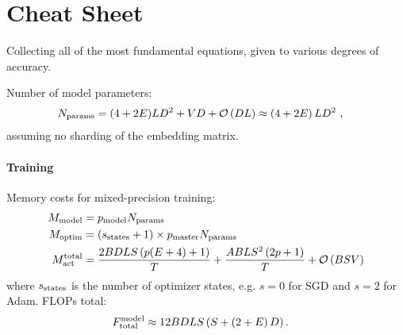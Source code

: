 \section{Cheat Sheet \label{app_cheat_sheet}}

Collecting all of the most fundamental equations, given to various degrees of accuracy.

Number of model parameters:
\begin{align}
	N _{ {\rm params} } & =   (4+2E)LD ^{ 2 } + VD+ \mathcal{O} \left( DL \right) \approx   \left ( 4+2E \right )LD ^{ 2 }\ ,
\end{align}
assuming no sharding of the embedding matrix.


\paragraph{Training}

Memory costs for mixed-precision training:
\begin{align}
	M _{ {\rm model} }                   & =p _{ {\rm model} } N _{ {\rm params} } \nonumber\\
	M _{ {\rm optim} }                   & =  \left ( s _{ {\rm states} }+1 \right) \times p _{ {\rm master } } N _{ {\rm params} } \nonumber\\
	M _{ {\rm act}  } ^{ {\rm  total}  } & =\frac{ 2BDLS   \left ( p(E+4) + 1   \right ) }{ T }
	+ \frac{ ABLS ^{ 2 } \left ( 2p+1\right ) }{ T }  + \mathcal{O} \left( BSV \right)
\end{align}
where $ s _{ {\rm  states} } $ is the number of optimizer states, e.g. $ s=0 $ for SGD and $ s=2 $
for Adam. FLOPs total:
\begin{align}
	F _{ {\rm total}  } ^{ {\rm  model}  } & \approx 12 BDLS \left ( S + \left ( 2+E \right )D \right ) .
\end{align}


